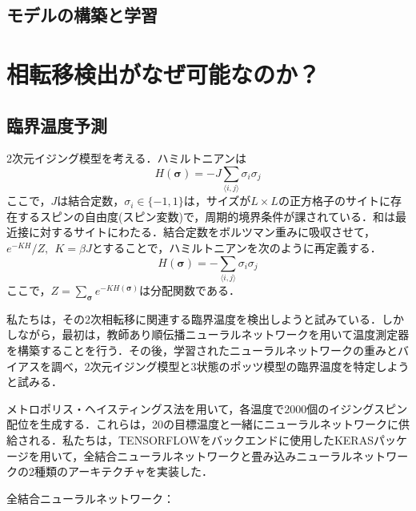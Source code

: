 \documentclass[a4paper,11pt]{jsreport}
\begin{document}
\subsection{モデルの構築と学習}


\section{相転移検出がなぜ可能なのか？}
\subsection{臨界温度予測}
2次元イジング模型を考える．ハミルトニアンは
\begin{equation*}
  H(\bm{\sigma}) = - J \sum_{\langle i,j \rangle} \sigma_i \sigma_j
\end{equation*}
ここで，$J$は結合定数，$\sigma_i \in \{ -1, 1 \}$は，サイズが$L \times L$の正方格子のサイトに存在するスピンの自由度(スピン変数)で，周期的境界条件が課されている．和は最近接に対するサイトにわたる．結合定数をボルツマン重みに吸収させて，$e^{-KH}/Z, \ \ K = \beta J$とすることで，ハミルトニアンを次のように再定義する．
\begin{equation}
  H(\bm{\sigma}) = - \sum_{\langle i,j \rangle} \sigma_i \sigma_j
\end{equation}
ここで，$Z = \sum_{\bm{\sigma}}e^{-KH(\bm{\sigma})}$は分配関数である．\par
私たちは，その2次相転移に関連する臨界温度を検出しようと試みている．しかしながら，最初は，教師あり順伝播ニューラルネットワークを用いて温度測定器を構築することを行う．その後，学習されたニューラルネットワークの重みとバイアスを調べ，2次元イジング模型と3状態のポッツ模型の臨界温度を特定しようと試みる．\par
メトロポリス・ヘイスティングス法を用いて，各温度で2000個のイジングスピン配位を生成する．これらは，20の目標温度と一緒にニューラルネットワークに供給される．私たちは，TENSORFLOWをバックエンドに使用したKERASパッケージを用いて，全結合ニューラルネットワークと畳み込みニューラルネットワークの2種類のアーキテクチャを実装した．\par
全結合ニューラルネットワーク：
\end{document}
